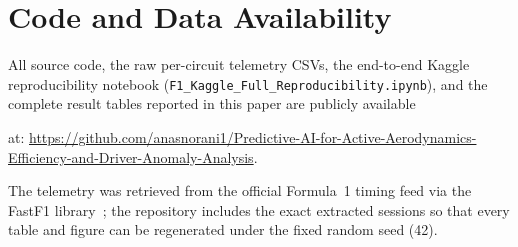 \documentclass[conference,a4paper]{IEEEtran}
\newif\ifblind
\begin{document}
\section*{Code and Data Availability}
All source code, the raw per-circuit telemetry CSVs, the end-to-end Kaggle reproducibility
notebook (\texttt{F1\_Kaggle\_Full\_Reproducibility.ipynb}), and the complete result tables
reported in this paper are publicly available
\ifblind
at a public repository whose URL is withheld for blind review (it will be provided in the
camera-ready version).
\else
at: \url{https://github.com/anasnorani1/Predictive-AI-for-Active-Aerodynamics-Efficiency-and-Driver-Anomaly-Analysis}.
\fi
The telemetry was retrieved from the official Formula~1 timing feed via the
FastF1 library~\cite{ref_fastf1}; the repository includes the exact extracted sessions so
that every table and figure can be regenerated under the fixed random seed (42).
\end{document}
